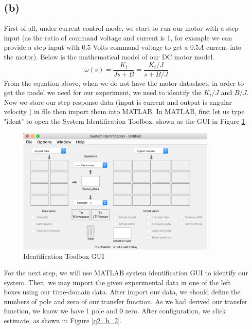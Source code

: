 \documentclass[letterpaper]{article}
\begin{document}
\subsection*{(b)}
First of all, under current control mode, we start to run our motor with a step input (as the ratio of command voltage and current is 1, for example we can provide a step input with $0.5$ Volts command voltage to get a $0.5A$ current into the motor). Below is the mathematical model of our DC motor model.\\
$$\omega (s)=\frac{K_t}{Js+B}=\frac{K_t/J}{s+B/J}$$
From the equation above, when we do not have the motor datasheet, in order to get the model we need for our experiment, we need to identify the $K_t/J$ and $B/J$. \\
Now we store our step response data (input is current and output is angular velocity ) in file then import them into MATLAB. In MATLAB, first let us type "ident" to open the System Identification Toolbox, shown as the GUI in Figure \ref{q2_b_1}.\\
\begin{figure}[htb]
\begin{center}
\includegraphics[width = 10cm]{q2_b_1.png}
\caption{Identification Toolbox GUI}
\label{q2_b_1}
\end{center}
\end{figure}
For the next step, we will use MATLAB system identification GUI to identify our system. Then, we may import the given experimental data in one of the left boxes using our time-domain data.
After import our data, we should define the numbers of pole and zero of our transfer function. As we had derived our transfer function, we know we have 1 pole and 0 zero. After configuration, we click estimate, as shown in Figure \ref{q2_b_2}.\\
\end{document}
